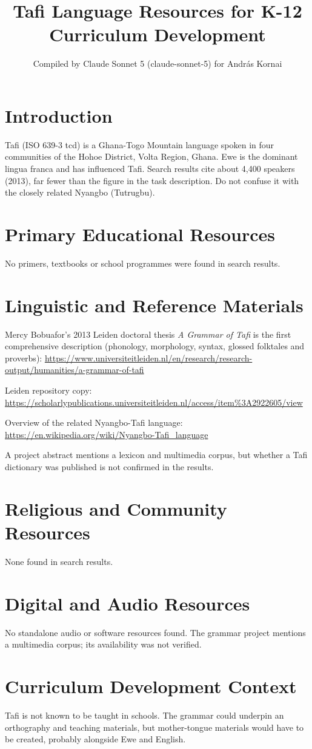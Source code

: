 \documentclass[12pt]{article}
\title{Tafi Language Resources for K-12 Curriculum Development}
\author{Compiled by Claude Sonnet 5 (claude-sonnet-5) for Andr\'as Kornai}
\date{}
\begin{document}
\maketitle
\section{Introduction}
Tafi (ISO 639-3 tcd) is a Ghana-Togo Mountain language spoken in four communities of the Hohoe District, Volta Region, Ghana. Ewe is the dominant lingua franca and has influenced Tafi. Search results cite about 4,400 speakers (2013), far fewer than the figure in the task description. Do not confuse it with the closely related Nyangbo (Tutrugbu).
\section{Primary Educational Resources}
No primers, textbooks or school programmes were found in search results.
\section{Linguistic and Reference Materials}
Mercy Bobuafor's 2013 Leiden doctoral thesis \emph{A Grammar of Tafi} is the first comprehensive description (phonology, morphology, syntax, glossed folktales and proverbs):
\url{https://www.universiteitleiden.nl/en/research/research-output/humanities/a-grammar-of-tafi}

Leiden repository copy: \url{https://scholarlypublications.universiteitleiden.nl/access/item%3A2922605/view}

Overview of the related Nyangbo-Tafi language: \url{https://en.wikipedia.org/wiki/Nyangbo-Tafi_language}

A project abstract mentions a lexicon and multimedia corpus, but whether a Tafi dictionary was published is not confirmed in the results.
\section{Religious and Community Resources}
None found in search results.
\section{Digital and Audio Resources}
No standalone audio or software resources found. The grammar project mentions a multimedia corpus; its availability was not verified.
\section{Curriculum Development Context}
Tafi is not known to be taught in schools. The grammar could underpin an orthography and teaching materials, but mother-tongue materials would have to be created, probably alongside Ewe and English.
\end{document}
